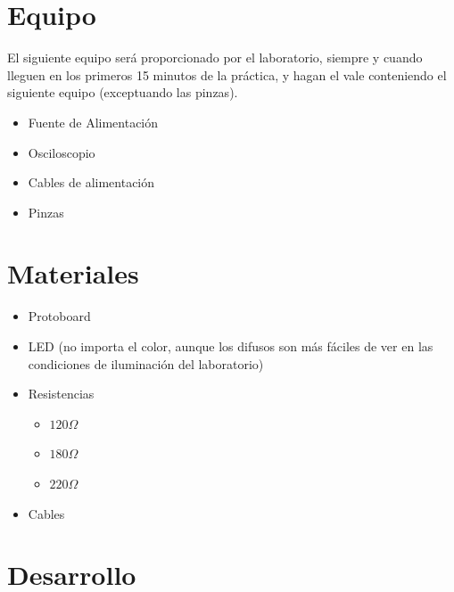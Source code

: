 \section{Equipo}

	El siguiente equipo será proporcionado por el laboratorio, siempre y cuando lleguen en los primeros 15 minutos de la práctica, y hagan el vale conteniendo el siguiente equipo (exceptuando las pinzas).

	\begin{itemize}
		\item Fuente de Alimentación
		\item Osciloscopio
		\item Cables de alimentación
		\item Pinzas
	\end{itemize}


\section{Materiales}

	\begin{itemize}
		\item Protoboard
		\item LED (no importa el color, aunque los difusos son más fáciles de ver en las condiciones de iluminación del laboratorio)
		\item Resistencias
		\begin{itemize}
			\item $120 \Omega$
			\item $180 \Omega$
			\item $220 \Omega$
		\end{itemize}
		\item Cables
	\end{itemize}


\section{Desarrollo}

